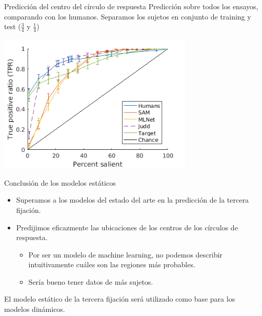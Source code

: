 \documentclass[compress]{beamer}
\begin{document}
\begin{frame}{Predicción del centro del círculo de respuesta}
{Predicción sobre todos los ensayos, comparando con los humanos. Separamos los sujetos en conjunto de training y test ($\frac{3}{4}$ y $\frac{1}{4}$)}

\begin{center}
\includegraphics[width=0.7\textwidth]{images/guess_all_test_2.png} 
\end{center}
\end{frame}


\begin{frame}{Conclusión de los modelos estáticos}
\begin{itemize}
\item Superamos a los modelos del estado del arte en la predicción de la tercera fijación.
\item Predijimos eficazmente las ubicaciones de los centros de los círculos de respuesta.
\begin{itemize}
\item Por ser un modelo de machine learning, no podemos describir intuitivamente cuáles son las regiones más probables.
\item Sería bueno tener datos de más sujetos.
\end{itemize}
\end{itemize}

\bigskip

El modelo estático de la tercera fijación será utilizado como base para los modelos dinámicos.
\end{frame}
\end{document}
